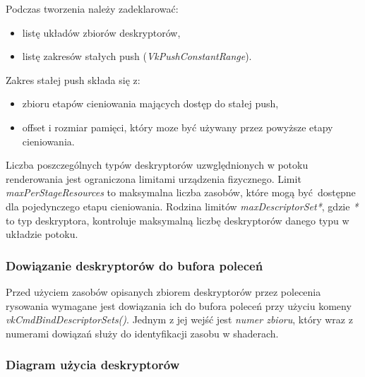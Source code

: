 Podczas tworzenia należy zadeklarować:
\begin{itemize}
	\item listę układów zbiorów deskryptorów,
	\item listę zakresów stałych push (\textit{VkPushConstantRange}).
\end{itemize}

Zakres stałej push składa się z:
\begin{itemize}
	\item zbioru etapów cieniowania mających dostęp do stałej push,
	\item offset i rozmiar pamięci, który moze być używany przez powyższe etapy cieniowania.
\end{itemize}

Liczba poszczególnych typów deskryptorów uzwględnionych w potoku renderowania jest ograniczona limitami urządzenia fizycznego.
Limit \textit{maxPerStageResources} to maksymalna liczba zasobów, które mogą być dostępne dla pojedynczego etapu cieniowania.
Rodzina limitów \textit{maxDescriptorSet*}, gdzie \textit{*} to typ deskryptora, kontroluje maksymalną liczbę deskryptorów danego typu w układzie potoku.

\subsubsection{Dowiązanie deskryptorów do bufora poleceń}

Przed użyciem zasobów opisanych zbiorem deskryptorów przez polecenia rysowania wymagane jest dowiązania ich do bufora
poleceń przy użyciu komeny \textit{vkCmdBindDescriptorSets()}. Jednym z jej wejść jest \textit{numer zbioru}, który wraz z numerami
dowiązań służy do identyfikacji zasobu w shaderach.


\subsubsection{Diagram użycia deskryptorów}

